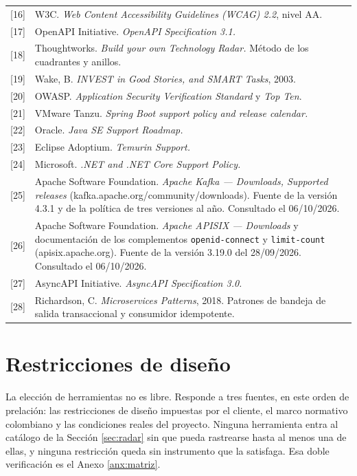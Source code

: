 \documentclass[11pt,a4paper]{article}
\begin{document}
\begin{longtable}{L{1.3cm} L{13.3cm}}
{[}16{]} & W3C. \emph{Web Content Accessibility Guidelines (WCAG) 2.2}, nivel AA. \\
{[}17{]} & OpenAPI Initiative. \emph{OpenAPI Specification 3.1.} \\
{[}18{]} & Thoughtworks. \emph{Build your own Technology Radar.} Método de los cuadrantes y anillos. \\
{[}19{]} & Wake, B. \emph{INVEST in Good Stories, and SMART Tasks}, 2003. \\
{[}20{]} & OWASP. \emph{Application Security Verification Standard} y \emph{Top Ten}. \\
{[}21{]} & VMware Tanzu. \emph{Spring Boot support policy and release calendar.} \\
{[}22{]} & Oracle. \emph{Java SE Support Roadmap.} \\
{[}23{]} & Eclipse Adoptium. \emph{Temurin Support.} \\
{[}24{]} & Microsoft. \emph{.NET and .NET Core Support Policy.} \\
{[}25{]} & Apache Software Foundation. \emph{Apache Kafka — Downloads, Supported releases} (kafka.apache.org/community/downloads). Fuente de la versión 4.3.1 y de la política de tres versiones al año. Consultado el 06/10/2026. \\
{[}26{]} & Apache Software Foundation. \emph{Apache APISIX — Downloads} y documentación de los complementos \texttt{openid-connect} y \texttt{limit-count} (apisix.apache.org). Fuente de la versión 3.19.0 del 28/09/2026. Consultado el 06/10/2026. \\
{[}27{]} & AsyncAPI Initiative. \emph{AsyncAPI Specification 3.0.} \\
{[}28{]} & Richardson, C. \emph{Microservices Patterns}, 2018. Patrones de bandeja de salida transaccional y consumidor idempotente. \\
\end{longtable}

\section{Restricciones de diseño}
\label{sec:restricciones}

La elección de herramientas no es libre. Responde a tres fuentes, en este orden de prelación: las restricciones de diseño impuestas por el cliente, el marco normativo colombiano y las condiciones reales del proyecto. Ninguna herramienta entra al catálogo de la Sección \ref{sec:radar} sin que pueda rastrearse hasta al menos una de ellas, y ninguna restricción queda sin instrumento que la satisfaga. Esa doble verificación es el Anexo \ref{anx:matriz}.
\end{document}
